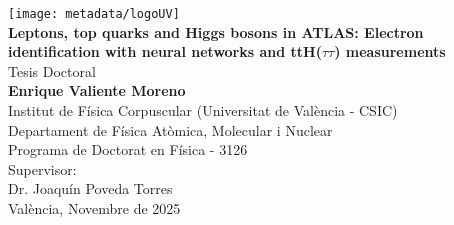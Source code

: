 \begin{titlepage}
    \begin{center}
        \vspace*{1cm} 
        \texttt{[image: metadata/logoUV]}\\[15mm]

        {\Large{\textbf{Leptons, top quarks and Higgs bosons in ATLAS: Electron identification with neural networks and ttH($\tau\tau$) measurements}}}\\[15mm]

        Tesis Doctoral\\
        {\large{\textbf{Enrique Valiente Moreno}}}\\[15mm]

        Institut de Física Corpuscular (Universitat de València - CSIC)\\
        Departament de Física Atòmica, Molecular i Nuclear\\
        Programa de Doctorat en Física - 3126\\[15mm]

        Supervisor:\\
        Dr. Joaquín Poveda Torres\\[15mm]

        València, Novembre de 2025
    \end{center}

\end{titlepage}